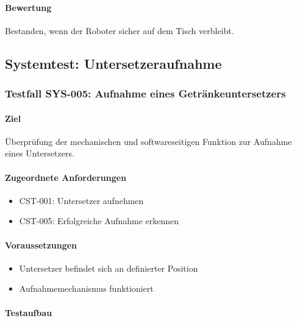 \paragraph{Bewertung}\label{bewertung-27}

Bestanden, wenn der Roboter sicher auf dem Tisch verbleibt.

\subsection{Systemtest:
Untersetzeraufnahme}\label{systemtest-untersetzeraufnahme}

\subsubsection{Testfall SYS-005: Aufnahme eines
Getränkeuntersetzers}\label{testfall-sys-005-aufnahme-eines-getruxe4nkeuntersetzers}

\paragraph{Ziel}\label{ziel-28}

Überprüfung der mechanischen und softwareseitigen Funktion zur Aufnahme
eines Untersetzers.

\paragraph{Zugeordnete
Anforderungen}\label{zugeordnete-anforderungen-28}

\begin{itemize}
\tightlist
\item
  CST-001: Untersetzer aufnehmen
\item
  CST-005: Erfolgreiche Aufnahme erkennen
\end{itemize}

\paragraph{Voraussetzungen}\label{voraussetzungen-27}

\begin{itemize}
\tightlist
\item
  Untersetzer befindet sich an definierter Position
\item
  Aufnahmemechanismus funktioniert
\end{itemize}

\paragraph{Testaufbau}\label{testaufbau-4}


